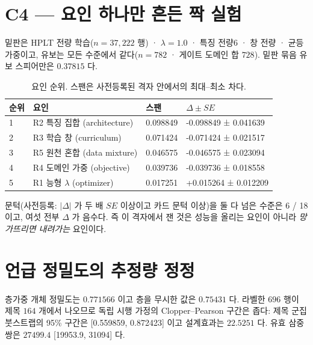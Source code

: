 \section{C4 — 요인 하나만 흔든 짝 실험}


밑판은 HPLT 전량 학습($n=37,222$ 행) · $\lambda=1.0$ · 특징 전량6 · 창 전량 · 균등 가중이고, 유보는 모든 수준에서 같다($n=782$ · 게이트 도메인 합 $728$). 밑판 묶음 유보 스피어만은 $0.37815$ 다.

\begin{table}[h]\centering
\begin{tabular}{llll}
\hline
순위 & 요인 & 스팬 & $\Delta \pm SE$ \\
\hline
1 & R2 특징 집합 (architecture) & 0.098849 & -0.098849 ± 0.041639 \\
2 & R3 학습 창 (curriculum) & 0.071424 & -0.071424 ± 0.021517 \\
3 & R5 원천 혼합 (data mixture) & 0.046575 & -0.046575 ± 0.023094 \\
4 & R4 도메인 가중 (objective) & 0.039736 & -0.039736 ± 0.018558 \\
5 & R1 능형 $\lambda$ (optimizer) & 0.017251 & +0.015264 ± 0.012209 \\
\hline
\end{tabular}
\caption{요인 순위. 스팬은 사전등록된 격자 안에서의 최대--최소 차다.}
\end{table}

문턱(사전등록: $|\Delta|$ 가 두 배 $SE$ 이상이고 카드 문턱 이상)을 둘 다 넘은 수준은 6 / 18 이고, 여섯 전부 $\Delta$ 가 음수다. 즉 이 격자에서 잰 것은 성능을 올리는 요인이 아니라 \emph{망가뜨리면 내려가는} 요인이다.

\section{언급 정밀도의 추정량 정정}


층가중 개체 정밀도는 $0.771566$ 이고 층을 무시한 값은 $0.75431$ 다. 라벨한 $696$ 행이 제목 $164$ 개에서 나오므로 독립 시행 가정의 Clopper--Pearson 구간은 좁다: 제목 군집 붓스트랩의 95\% 구간은 [0.559859, 0.872423] 이고 설계효과는 $22.5251$ 다. 유효 삼중쌍은 $27499.4$ [19953.9, 31094] 다.
